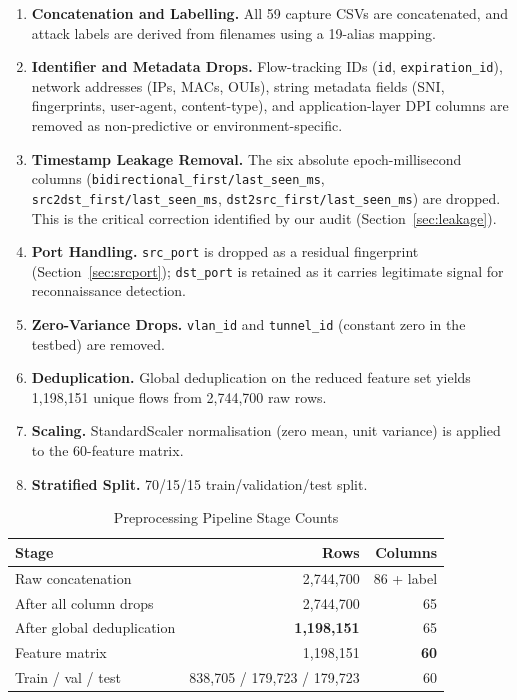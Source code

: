 \documentclass[conference]{IEEEtran}
\newcommand{\col}[1]{\texttt{\small #1}}
\begin{document}
\begin{enumerate}
    \item \textbf{Concatenation and Labelling.} All 59 capture CSVs are concatenated, and attack labels are derived from filenames using a 19-alias mapping.
    \item \textbf{Identifier and Metadata Drops.} Flow-tracking IDs (\col{id}, \col{expiration\_id}), network addresses (IPs, MACs, OUIs), string metadata fields (SNI, fingerprints, user-agent, content-type), and application-layer DPI columns are removed as non-predictive or environment-specific.
    \item \textbf{Timestamp Leakage Removal.} The six absolute epoch-millisecond columns (\col{bidirectional\_first/last\_seen\_ms}, \col{src2dst\_first/last\_seen\_ms}, \col{dst2src\_first/last\_seen\_ms}) are dropped. This is the critical correction identified by our audit (Section~\ref{sec:leakage}).
    \item \textbf{Port Handling.} \col{src\_port} is dropped as a residual fingerprint (Section~\ref{sec:srcport}); \col{dst\_port} is retained as it carries legitimate signal for reconnaissance detection.
    \item \textbf{Zero-Variance Drops.} \col{vlan\_id} and \col{tunnel\_id} (constant zero in the testbed) are removed.
    \item \textbf{Deduplication.} Global deduplication on the reduced feature set yields 1,198,151 unique flows from 2,744,700 raw rows.
    \item \textbf{Scaling.} StandardScaler normalisation (zero mean, unit variance) is applied to the 60-feature matrix.
    \item \textbf{Stratified Split.} 70/15/15 train/validation/test split.
\end{enumerate}

\begin{table}[htbp]
\caption{Preprocessing Pipeline Stage Counts}
\centering
\begin{tabular}{lrr}
\toprule
\textbf{Stage} & \textbf{Rows} & \textbf{Columns} \\
\midrule
Raw concatenation & 2,744,700 & 86 + label \\
After all column drops & 2,744,700 & 65 \\
After global deduplication & \textbf{1,198,151} & 65 \\
Feature matrix & 1,198,151 & \textbf{60} \\
Train / val / test & 838,705 / 179,723 / 179,723 & 60 \\
\bottomrule
\end{tabular}
\label{tab:pipeline}
\end{table}
\end{document}
